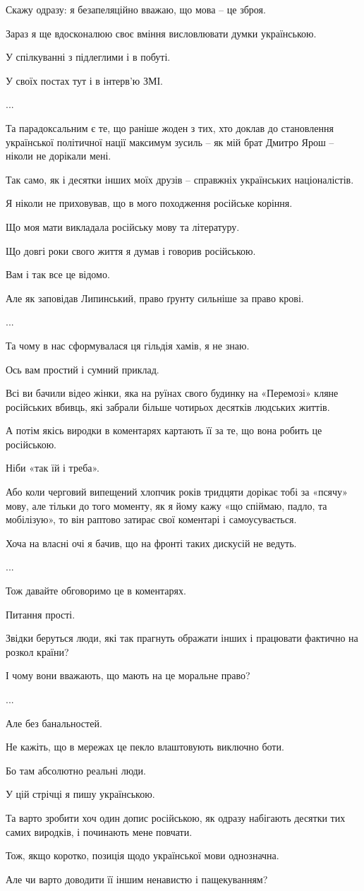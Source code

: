 Скажу одразу: я безапеляційно вважаю, що мова – це зброя. 

Зараз я ще вдосконалюю своє вміння висловлювати думки українською. 

У спілкуванні з підлеглими і в побуті. 

У своїх постах тут і в інтерв'ю ЗМІ. 

...

Та парадоксальним є те, що раніше жоден з тих, хто доклав до становлення
української політичної нації максимум зусиль – як мій брат Дмитро Ярош  –
ніколи не дорікали мені.

Так само, як і десятки інших моїх друзів – справжніх українських націоналістів. 

Я ніколи не приховував, що в мого походження російське коріння. 

Що моя мати викладала російську мову та літературу. 

Що довгі роки свого життя я думав і говорив російською. 

Вам і так все це відомо. 

Але як заповідав Липинський, право ґрунту сильніше за право крові. 

...

Та чому в нас сформувалася ця гільдія хамів, я не знаю.

Ось вам простий і сумний приклад. 

Всі ви бачили відео жінки, яка на руїнах свого будинку на «Перемозі» кляне
російських вбивць, які забрали більше чотирьох десятків людських життів. 

А потім якісь виродки в коментарях картають її за те, що вона робить це
російською.

Ніби «так їй і треба».

Або коли черговий випещений хлопчик років тридцяти дорікає тобі за «псячу»
мову, але тільки до того моменту, як я йому кажу «що спіймаю, падло, та
мобілізую», то він раптово затирає свої коментарі і самоусувається.

Хоча на власні очі я бачив, що на фронті таких дискусій не ведуть. 

...

Тож давайте обговоримо це в коментарях. 

Питання прості. 

Звідки беруться люди, які так прагнуть ображати інших і працювати фактично на
розкол країни?

І чому вони вважають, що мають на це моральне право? 

...

Але без банальностей. 

Не кажіть, що в мережах це пекло влаштовують виключно боти. 

Бо там абсолютно реальні люди. 

У цій стрічці я пишу українською. 

Та варто зробити хоч один допис російською, як одразу набігають десятки тих
самих виродків, і починають мене повчати. 

Тож, якщо коротко, позиція щодо української мови однозначна. 

Але чи варто доводити її іншим ненавистю і пащекуванням?
